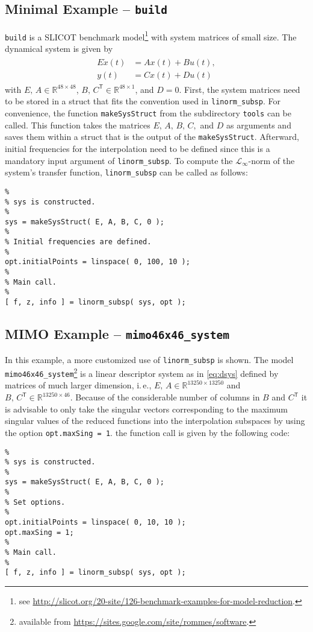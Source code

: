 \documentclass[10pt,a4paper]{article}
\begin{document}
\subsection{Minimal Example -- \texttt{build}}
\texttt{build} is a SLICOT benchmark model\footnote{see \url{http://slicot.org/20-site/126-benchmark-examples-for-model-reduction}.} with system matrices of small size. The dynamical system is given by
\begin{align} \label{eq:dsys}
\begin{split}
E\dot{x}(t) &= Ax(t) + Bu(t), \\
       y(t) &= Cx(t) + Du(t)
\end{split}
\end{align}
with $E,\,A \in \mathbb{R}^{48 \times 48}$, $B,\,C^\mathsf{T} \in \mathbb{R}^{48 \times 1}$, and $D = 0$. First, the system matrices need to be stored in a struct that fits the convention used in \texttt{linorm\_subsp}. For convenience, the function \texttt{makeSysStruct} from the subdirectory \texttt{tools} can be called. This function takes the matrices $E,\,A,\,B,\,C,$ and $D$ as arguments and saves them within a struct that is the output of the \texttt{makeSysStruct}. Afterward, initial frequencies for the interpolation need to be defined since this is a mandatory input argument of \texttt{linorm\_subsp}. To compute the $\mathcal{L}_\infty$-norm of the system's transfer function, \texttt{linorm\_subsp} can be called as follows:
\begin{verbatim}
%
% sys is constructed.
%
sys = makeSysStruct( E, A, B, C, 0 );
%
% Initial frequencies are defined.
%
opt.initialPoints = linspace( 0, 100, 10 );
%
% Main call.
%
[ f, z, info ] = linorm_subsp( sys, opt );
\end{verbatim}

\subsection{MIMO Example -- \texttt{mimo46x46\_system}}
In this example, a more customized use of \texttt{linorm\_subsp} is shown. The model \texttt{mimo46x46\_system}\footnote{available from \url{https://sites.google.com/site/rommes/software}.} is a linear descriptor system as in \eqref{eq:dsys} defined by matrices of much larger dimension, i.\,e., $E,\,A \in \mathbb{R}^{13250 \times 13250}$ and $B,\,C^\mathsf{T} \in \mathbb{R}^{13250 \times 46}$. Because of the considerable number of columns in $B$ and $C^\mathsf{T}$ it is advisable to only take the singular vectors corresponding to the maximum singular values of the reduced functions into the interpolation subspaces by using the option \texttt{opt.maxSing = 1}. the function call is given by the following code:
\begin{verbatim}
%
% sys is constructed.
%
sys = makeSysStruct( E, A, B, C, 0 );
%
% Set options.
%
opt.initialPoints = linspace( 0, 10, 10 );
opt.maxSing = 1;
%
% Main call.
%
[ f, z, info ] = linorm_subsp( sys, opt ); 
\end{verbatim}
\end{document}
